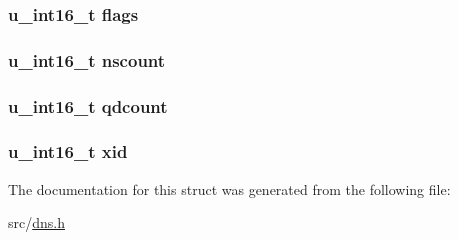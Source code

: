 \subsubsection[{\texorpdfstring{flags}{flags}}]{\setlength{\rightskip}{0pt plus 5cm}u\+\_\+int16\+\_\+t flags}\hypertarget{struct_dns_hdr_a9ee1a422c42e31a1f1638ac614822623}{}\label{struct_dns_hdr_a9ee1a422c42e31a1f1638ac614822623}
\subsubsection[{\texorpdfstring{nscount}{nscount}}]{\setlength{\rightskip}{0pt plus 5cm}u\+\_\+int16\+\_\+t nscount}\hypertarget{struct_dns_hdr_aa58fc67b6cd177d0c2cb08a387bea37c}{}\label{struct_dns_hdr_aa58fc67b6cd177d0c2cb08a387bea37c}
\subsubsection[{\texorpdfstring{qdcount}{qdcount}}]{\setlength{\rightskip}{0pt plus 5cm}u\+\_\+int16\+\_\+t qdcount}\hypertarget{struct_dns_hdr_a47208e7c5942b3c64bc2791d676e6f8e}{}\label{struct_dns_hdr_a47208e7c5942b3c64bc2791d676e6f8e}
\subsubsection[{\texorpdfstring{xid}{xid}}]{\setlength{\rightskip}{0pt plus 5cm}u\+\_\+int16\+\_\+t xid}\hypertarget{struct_dns_hdr_a0d82f4641a97b37727ccbead814b84f7}{}\label{struct_dns_hdr_a0d82f4641a97b37727ccbead814b84f7}


The documentation for this struct was generated from the following file\+:\begin{DoxyCompactItemize}
\item 
src/\hyperlink{dns_8h}{dns.\+h}\end{DoxyCompactItemize}
